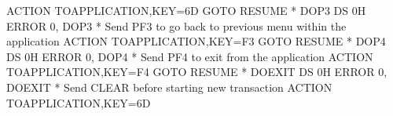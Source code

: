 \documentclass[letterpaper,10pt,english]{sphinxmanual}
\begin{document}
\begin{sphinxVerbatim}[commandchars=\\\{\}]
         ACTION\PYGZdl{}  TO\PYGZhy{}APPLICATION,KEY=6D
         GOTO\PYGZdl{} RESUME
*\PYGZus{}\PYGZus{}\PYGZus{}\PYGZus{}\PYGZus{}\PYGZus{}\PYGZus{}\PYGZus{}\PYGZus{}\PYGZus{}\PYGZus{}\PYGZus{}\PYGZus{}\PYGZus{}\PYGZus{}\PYGZus{}\PYGZus{}\PYGZus{}\PYGZus{}\PYGZus{}\PYGZus{}\PYGZus{}\PYGZus{}\PYGZus{}\PYGZus{}\PYGZus{}\PYGZus{}\PYGZus{}\PYGZus{}\PYGZus{}\PYGZus{}\PYGZus{}\PYGZus{}\PYGZus{}\PYGZus{}\PYGZus{}\PYGZus{}\PYGZus{}\PYGZus{}\PYGZus{}\PYGZus{}\PYGZus{}\PYGZus{}\PYGZus{}\PYGZus{}\PYGZus{}\PYGZus{}\PYGZus{}\PYGZus{}\PYGZus{}\PYGZus{}\PYGZus{}\PYGZus{}\PYGZus{}\PYGZus{}\PYGZus{}\PYGZus{}\PYGZus{}\PYGZus{}\PYGZus{}\PYGZus{}\PYGZus{}\PYGZus{}\PYGZus{}\PYGZus{}\PYGZus{}\PYGZus{}\PYGZus{}\PYGZus{}\PYGZus{}
DOP3     DS   0H
         ERROR\PYGZdl{} 0,\PYGZsq{}\PYGZhy{}\PYGZhy{}\PYGZhy{} DOP3\PYGZsq{}
* Send PF3 to go back to previous menu within the application
         ACTION\PYGZdl{}  TO\PYGZhy{}APPLICATION,KEY=F3
         GOTO\PYGZdl{} RESUME
*\PYGZus{}\PYGZus{}\PYGZus{}\PYGZus{}\PYGZus{}\PYGZus{}\PYGZus{}\PYGZus{}\PYGZus{}\PYGZus{}\PYGZus{}\PYGZus{}\PYGZus{}\PYGZus{}\PYGZus{}\PYGZus{}\PYGZus{}\PYGZus{}\PYGZus{}\PYGZus{}\PYGZus{}\PYGZus{}\PYGZus{}\PYGZus{}\PYGZus{}\PYGZus{}\PYGZus{}\PYGZus{}\PYGZus{}\PYGZus{}\PYGZus{}\PYGZus{}\PYGZus{}\PYGZus{}\PYGZus{}\PYGZus{}\PYGZus{}\PYGZus{}\PYGZus{}\PYGZus{}\PYGZus{}\PYGZus{}\PYGZus{}\PYGZus{}\PYGZus{}\PYGZus{}\PYGZus{}\PYGZus{}\PYGZus{}\PYGZus{}\PYGZus{}\PYGZus{}\PYGZus{}\PYGZus{}\PYGZus{}\PYGZus{}\PYGZus{}\PYGZus{}\PYGZus{}\PYGZus{}\PYGZus{}\PYGZus{}\PYGZus{}\PYGZus{}\PYGZus{}\PYGZus{}\PYGZus{}\PYGZus{}\PYGZus{}\PYGZus{}
DOP4     DS   0H
         ERROR\PYGZdl{} 0,\PYGZsq{}\PYGZhy{}\PYGZhy{}\PYGZhy{} DOP4\PYGZsq{}
* Send PF4 to exit from the application
         ACTION\PYGZdl{}  TO\PYGZhy{}APPLICATION,KEY=F4
         GOTO\PYGZdl{} RESUME
*\PYGZus{}\PYGZus{}\PYGZus{}\PYGZus{}\PYGZus{}\PYGZus{}\PYGZus{}\PYGZus{}\PYGZus{}\PYGZus{}\PYGZus{}\PYGZus{}\PYGZus{}\PYGZus{}\PYGZus{}\PYGZus{}\PYGZus{}\PYGZus{}\PYGZus{}\PYGZus{}\PYGZus{}\PYGZus{}\PYGZus{}\PYGZus{}\PYGZus{}\PYGZus{}\PYGZus{}\PYGZus{}\PYGZus{}\PYGZus{}\PYGZus{}\PYGZus{}\PYGZus{}\PYGZus{}\PYGZus{}\PYGZus{}\PYGZus{}\PYGZus{}\PYGZus{}\PYGZus{}\PYGZus{}\PYGZus{}\PYGZus{}\PYGZus{}\PYGZus{}\PYGZus{}\PYGZus{}\PYGZus{}\PYGZus{}\PYGZus{}\PYGZus{}\PYGZus{}\PYGZus{}\PYGZus{}\PYGZus{}\PYGZus{}\PYGZus{}\PYGZus{}\PYGZus{}\PYGZus{}\PYGZus{}\PYGZus{}\PYGZus{}\PYGZus{}\PYGZus{}\PYGZus{}\PYGZus{}\PYGZus{}\PYGZus{}\PYGZus{}
DOEXIT   DS   0H
         ERROR\PYGZdl{} 0,\PYGZsq{}\PYGZhy{}\PYGZhy{}\PYGZhy{} DOEXIT\PYGZsq{}
* Send CLEAR before starting new transaction
         ACTION\PYGZdl{}  TO\PYGZhy{}APPLICATION,KEY=6D

\end{sphinxVerbatim}
\end{document}
